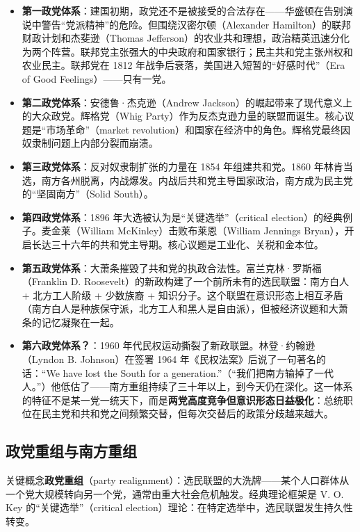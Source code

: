 \documentclass[12pt,a4paper]{ctexart}
\begin{document}
\begin{itemize}
  \item \textbf{第一政党体系}：建国初期，政党还不是被接受的合法存在——华盛顿在告别演说中警告``党派精神''的危险。但围绕汉密尔顿（Alexander Hamilton）的联邦财政计划和杰斐逊（Thomas Jefferson）的农业共和理想，政治精英迅速分化为两个阵营。联邦党主张强大的中央政府和国家银行；民主共和党主张州权和农业民主。联邦党在 1812 年战争后衰落，美国进入短暂的``好感时代''（Era of Good Feelings）——只有一党。
  \item \textbf{第二政党体系}：安德鲁·杰克逊（Andrew Jackson）的崛起带来了现代意义上的大众政党。辉格党（Whig Party）作为反杰克逊力量的联盟而诞生。核心议题是``市场革命''（market revolution）和国家在经济中的角色。辉格党最终因奴隶制问题上内部分裂而崩溃。
  \item \textbf{第三政党体系}：反对奴隶制扩张的力量在 1854 年组建共和党。1860 年林肯当选，南方各州脱离，内战爆发。内战后共和党主导国家政治，南方成为民主党的``坚固南方''（Solid South）。
  \item \textbf{第四政党体系}：1896 年大选被认为是``关键选举''（critical election）的经典例子。麦金莱（William McKinley）击败布莱恩（William Jennings Bryan），开启长达三十六年的共和党主导期。核心议题是工业化、关税和金本位。
  \item \textbf{第五政党体系}：大萧条摧毁了共和党的执政合法性。富兰克林·罗斯福（Franklin D. Roosevelt）的新政构建了一个前所未有的选民联盟：南方白人 + 北方工人阶级 + 少数族裔 + 知识分子。这个联盟在意识形态上相互矛盾（南方白人是种族保守派，北方工人和黑人是自由派），但被经济议题和大萧条的记忆凝聚在一起。
  \item \textbf{第六政党体系？}：1960 年代民权运动撕裂了新政联盟。林登·约翰逊（Lyndon B. Johnson）在签署 1964 年《民权法案》后说了一句著名的话：``We have lost the South for a generation.''（``我们把南方输掉了一代人。''）他低估了——南方重组持续了三十年以上，到今天仍在深化。这一体系的特征不是某一党一统天下，而是\textbf{两党高度竞争但意识形态日益极化}：总统职位在民主党和共和党之间频繁交替，但每次交替后的政策分歧越来越大。
\end{itemize}

\subsection{政党重组与南方重组}

关键概念\textbf{政党重组}（party realignment）：选民联盟的大洗牌——某个人口群体从一个党大规模转向另一个党，通常由重大社会危机触发。经典理论框架是 V. O. Key 的``关键选举''（critical election）理论：在特定选举中，选民联盟发生持久性转变。
\end{document}

